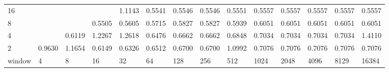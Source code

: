 \begin{table}[h]
{\begin{tabular}{lrrrrrrrrrrrrr}
			\multicolumn{1}{|l|}{16} &  &  &  & \cellcolor[HTML]{4C00E6}1.1143 & \cellcolor[HTML]{99E600}0.5541 & \cellcolor[HTML]{99E600}0.5546 & \cellcolor[HTML]{99E600}0.5546 & \cellcolor[HTML]{99E600}0.5551 & \cellcolor[HTML]{99E600}0.5557 & \cellcolor[HTML]{99E600}0.5557 & \cellcolor[HTML]{99E600}0.5557 & \cellcolor[HTML]{99E600}0.5557 & \cellcolor[HTML]{99E600}0.5557 \\ \cline{1-1}
			\multicolumn{1}{|l|}{8} &  &  & \cellcolor[HTML]{99E600}0.5505 & \cellcolor[HTML]{99E600}0.5605 & \cellcolor[HTML]{99E600}0.5715 & \cellcolor[HTML]{99E600}0.5827 & \cellcolor[HTML]{99E600}0.5827 & \cellcolor[HTML]{99E600}0.5939 & \cellcolor[HTML]{99E600}0.6051 & \cellcolor[HTML]{99E600}0.6051 & \cellcolor[HTML]{99E600}0.6051 & \cellcolor[HTML]{99E600}0.6051 & \cellcolor[HTML]{99E600}0.6051 \\ \cline{1-1}
			\multicolumn{1}{|l|}{4} &  & \cellcolor[HTML]{99E600}0.6119 & \cellcolor[HTML]{4C00E6}1.2267 & \cellcolor[HTML]{4C00E6}1.2618 & \cellcolor[HTML]{99E600}0.6476 & \cellcolor[HTML]{99E600}0.6662 & \cellcolor[HTML]{99E600}0.6662 & \cellcolor[HTML]{E69900}0.6848 & \cellcolor[HTML]{E69900}0.7034 & \cellcolor[HTML]{E69900}0.7034 & \cellcolor[HTML]{E69900}0.7034 & \cellcolor[HTML]{E69900}0.7034 & \cellcolor[HTML]{4C00E6}1.4110 \\ \cline{1-1}
			\multicolumn{1}{|l|}{2} & \cellcolor[HTML]{4C00E6}0.9630 & \cellcolor[HTML]{4C00E6}1.1654 & \cellcolor[HTML]{99E600}0.6149 & \cellcolor[HTML]{99E600}0.6326 & \cellcolor[HTML]{99E600}0.6512 & \cellcolor[HTML]{E69900}0.6700 & \cellcolor[HTML]{E69900}0.6700 & \cellcolor[HTML]{E69900}1.0992 & \cellcolor[HTML]{E69900}0.7076 & \cellcolor[HTML]{E69900}0.7076 & \cellcolor[HTML]{E69900}0.7076 & \cellcolor[HTML]{E69900}0.7076 & \cellcolor[HTML]{E69900}0.7076 \\ \cline{1-1}
			\multicolumn{1}{l|}{window} & \multicolumn{1}{l|}{4} & \multicolumn{1}{l|}{8} & \multicolumn{1}{l|}{16} & \multicolumn{1}{l|}{32} & \multicolumn{1}{l|}{64} & \multicolumn{1}{l|}{128} & \multicolumn{1}{l|}{256} & \multicolumn{1}{l|}{512} & \multicolumn{1}{l|}{1024} & \multicolumn{1}{l|}{2048} & \multicolumn{1}{l|}{4096} & \multicolumn{1}{l|}{8129} & \multicolumn{1}{l|}{16384} \\ \cline{2-14}
		\end{tabular}
	}
\end{table}





